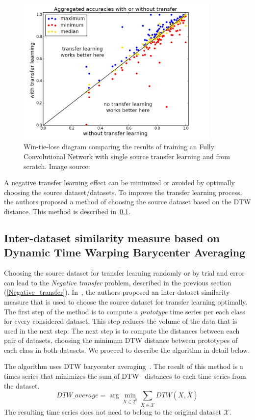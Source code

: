 \documentclass[a4paper,11pt,twoside]{report}
\theoremstyle{definition}
\DeclareMathOperator{\real}{\mathbb{R}}
\begin{document}
\begin{figure}[h!]
\centering
\includegraphics[width=10cm]{imgs/max_min_transfer_learning.png}
\caption{Win-tie-lose diagram comparing the results of training an Fully Convolutional Network with single source transfer learning and from scratch. Image source:~\cite{transfer_learning_time_series}}
\label{fig:tr_learning_min_max}
\end{figure}
\FloatBarrier
A negative transfer learning effect can be minimized or avoided by optimally choosing the source dataset/datasets. To improve the transfer learning process, the authors proposed a method of choosing the source dataset based on the DTW distance. This method is described in~\ref{DTW_choosing}.

\subsection{Inter-dataset similarity measure based on Dynamic Time Warping Barycenter Averaging} \label{DTW_choosing}
Choosing the source dataset for transfer learning randomly or by trial and error can lead to the \textit{Negative transfer} problem, described in the previous section (\ref{Negative_transfer}). In~\cite{transfer_learning_time_series}, the authors proposed an inter-dataset similarity measure that is used to choose the source dataset for transfer learning optimally. The first step of the method is to compute a \textit{prototype} time series per each class for every considered dataset. This step reduces the volume of the data that is used in the next step. The next step is to compute the distances between each pair of datasets, choosing the minimum DTW distance between prototypes of each class in both datasets. We proceed to describe the algorithm in detail below.

The algorithm uses DTW barycenter averaging~\cite{dtw_dba}. The result of this method is a times series that minimizes the sum of DTW~\cite{dtw} distances to each time series from the dataset.
$$DTW\_average = \arg\min_{X \in  2^{\real}}  \sum_{\bar{X}\in \mathcal{X}} DTW(X, \bar{X})$$
The resulting time series does not need to belong to the original dataset $\mathcal{X}$.
\end{document}
